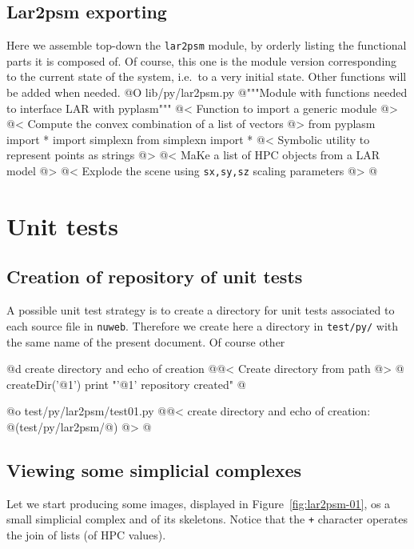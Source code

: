 \documentclass[11pt,oneside]{article}    %
\begin{document}
\subsection{Lar2psm exporting}
\label{sec:lar2psm}
Here we assemble top-down the \texttt{lar2psm} module, by orderly listing the functional parts it is composed of. Of course, this one is the module version corresponding to the current state of the system, i.e.~to a very initial state. Other functions will be added when needed.
@O lib/py/lar2psm.py
@{"""Module with functions needed to interface LAR with pyplasm"""
@< Function to import a generic module @>
@< Compute the convex combination of a list of vectors @>
from pyplasm import *
import simplexn
from simplexn import *
@< Symbolic utility to represent points as strings @>
@< MaKe a list of HPC objects from a LAR model @>
@< Explode the scene using \texttt{sx,sy,sz} scaling parameters @>
@}


\section{Unit tests}

\subsection{Creation of repository of unit tests}

A possible unit test strategy is to create a directory for unit tests associated to each source file in \texttt{nuweb}. Therefore we create here a directory in \texttt{test/py/} with the same name of the present document. Of course other 

@d create directory and echo of creation
@{@< Create directory from path @>
@%
createDir('@1')
print "'@1' repository created"
@}

@o test/py/lar2psm/test01.py
@{@< create directory  and echo of creation: @(test/py/lar2psm/@) @>
@}


\subsection{Viewing some simplicial complexes}
Let we start producing some images, displayed in Figure~\ref{fig:lar2psm-01}, os a small simplicial complex and of its skeletons. Notice that the \texttt{+} character operates the join of lists (of HPC values).
\end{document}
